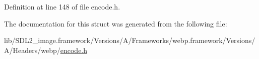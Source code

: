 Definition at line 148 of file encode.\+h.



The documentation for this struct was generated from the following file\+:\begin{DoxyCompactItemize}
\item 
lib/\+S\+D\+L2\+\_\+image.\+framework/\+Versions/\+A/\+Frameworks/webp.\+framework/\+Versions/\+A/\+Headers/webp/\mbox{\hyperlink{encode_8h}{encode.\+h}}\end{DoxyCompactItemize}

